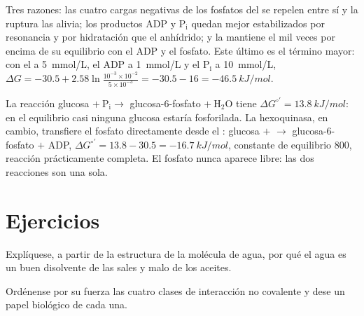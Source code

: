 \begin{example}\label{ex:b1:water-small-molecules:whyatp}
Tres razones: las cuatro cargas negativas de los fosfatos del  se repelen
entre sí y la ruptura las alivia; los productos $\mathrm{ADP}$ y
$\mathrm{P_i}$ quedan mejor estabilizados por resonancia y por hidratación
que el anhídrido; y la  mantiene el  mil veces por encima de su
equilibrio con el ADP y el fosfato. Este último es el término mayor: con el
 a \qty{5}{mmol/L}, el ADP a \qty{1}{mmol/L} y el $\mathrm{P_i}$ a
\qty{10}{mmol/L},
$\Delta G = -30.5 + 2.58\ln\frac{10^{-3}\times 10^{-2}}{5\times 10^{-3}}
= -30.5 - 16 = \qty{-46.5}{kJ/mol}$.
\end{example}

\begin{example}[Acoplamiento]\label{ex:b1:water-small-molecules:coupling}
La reacción glucosa $+\ \mathrm{P_i} \to$ glucosa-6-fosfato
$+\ \mathrm{H_2O}$ tiene $\Delta G^{\circ\prime} = \qty{+13.8}{kJ/mol}$: en
el equilibrio casi ninguna glucosa estaría fosforilada. La hexoquinasa, en
cambio, transfiere el fosfato directamente desde el : glucosa $+$ 
$\to$ glucosa-6-fosfato $+$ ADP, $\Delta G^{\circ\prime} = 13.8 - 30.5 =
\qty{-16.7}{kJ/mol}$, constante de equilibrio $800$, reacción prácticamente
completa. El fosfato nunca aparece libre: las dos reacciones son una sola.
\end{example}

\section{Ejercicios}

\begin{exercise}[$\star$]\label{exo:b1:water-small-molecules:1}
Explíquese, a partir de la estructura de la molécula de agua, por qué el
agua es un buen disolvente de las sales y malo de los aceites.
\end{exercise}

\begin{exercise}[$\star$]\label{exo:b1:water-small-molecules:2}
Ordénense por su fuerza las cuatro clases de interacción no covalente y dese
un papel biológico de cada una.
\end{exercise}

